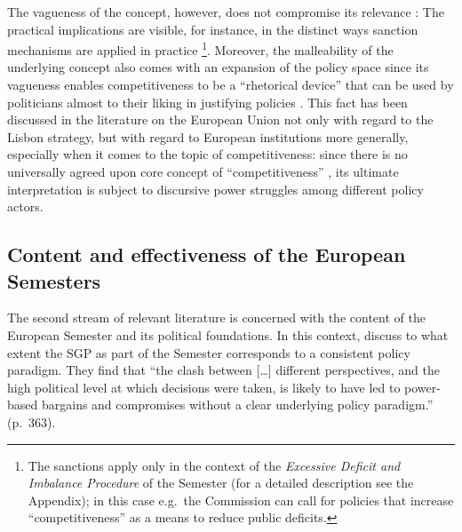 \documentclass[
]{article}
\begin{document}
The vagueness of the concept, however, does not compromise its relevance
\citep[p. 63]{Aiginger}:
The practical implications are visible, for instance, in the distinct ways sanction
mechanisms are applied in practice \footnote{The sanctions apply only in the context
  of the \emph{Excessive Deficit and Imbalance Procedure} of the Semester (for a detailed
  description see the Appendix); in this case e.g.~the Commission can call for policies
  that increase \enquote{competitiveness} as a means to reduce public deficits.}.
Moreover, the malleability of the underlying concept also comes with an
expansion of the policy space since its vagueness
enables competitiveness to be a \enquote{rhetorical device} that can be used by politicians
almost to their liking in justifying policies \citep[p. 865]{Linsi}.
This fact has been discussed in the literature on the European Union not only with regard
to the Lisbon strategy, but with regard to European institutions more generally,
especially when it comes to
the topic of competitiveness: since there is no universally agreed upon core
concept of \enquote{competitiveness} \citep[e.g.][]{Hay2007, blyth, Princen2016},
its ultimate interpretation is subject to discursive power struggles
among different policy actors.

\hypertarget{content-and-effectiveness-of-the-european-semesters}{%
\subsection{Content and effectiveness of the European Semesters}\label{content-and-effectiveness-of-the-european-semesters}}

The second stream of relevant literature is concerned
with the content of the European Semester and its political foundations.
In this context, \citet{Princen2016} discuss to what extent the SGP as part of
the Semester corresponds to a consistent policy paradigm.
They find that \enquote{the clash between {[}\ldots{]} different perspectives, and the high
political level at which decisions were taken, is likely to have led to
power-based bargains and compromises without a clear underlying policy paradigm.}
(p.~363).
\end{document}
